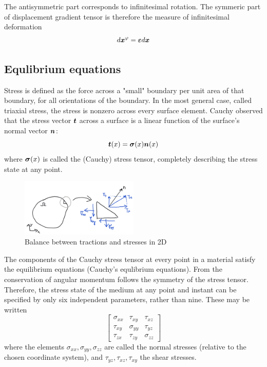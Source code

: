 \documentclass[11pt]{article}
\begin{document}
The antisymmetric part corresponds to infinitesimal rotation. The symmeric part of displacement gradient tensor is therefore the measure of infinitesimal deformation
$$
d\mbox{\boldmath$x$}^\varphi = \mbox{\boldmath$\varepsilon$} d\mbox{\boldmath$x$}
$$
\subsection{Equlibrium equations}
Stress is defined as the force across a "small" boundary per unit area of that boundary, for all orientations of the boundary. In the most general case, called triaxial stress, the stress is nonzero across every surface element. Cauchy observed that the stress vector $\mbox{\boldmath$t$}$ across a surface is a linear function of the surface's normal vector $\mbox{\boldmath$n$}$:
$$
\mbox{\boldmath$t$}(x)=\mbox{\boldmath$\sigma$}(x)\mbox{\boldmath$n$}(x)
$$
where $\mbox{\boldmath$\sigma$}(x)$ is called the (Cauchy) stress tensor, completely describing the stress state at any point.
\begin{figure}
  \begin{center}
    \includegraphics[width=0.5\textwidth]{tractionstressrelation.png}
  \end{center}
  \label{fig:tractionstressrelation}
  \caption{Balance between tractions and stresses in 2D}
\end{figure}

The components of the Cauchy stress tensor at every point in a material satisfy the equilibrium equations (Cauchy’s equlibrium equations). From the conservation of angular momentum follows the symmetry of the stress tensor. Therefore, the stress state of the medium at any point and instant can be specified by only six independent parameters, rather than nine. These may be written
$$
\left[
  \begin{array}{ccc}
    \sigma_{xx} & \tau_{xy} & \tau_{xz}\\
    \tau_{xy} & \sigma_{yy} & \tau_{yz}\\
    \tau_{zx} & \tau_{zy} & \sigma_{zz}
  \end{array}
\right] 
$$
where the elements $\sigma_{xx}, \sigma_{yy}, \sigma_{zz}$ are called the normal stresses (relative to the chosen coordinate system), and $\tau_{yz}, \tau_{xz}, \tau_{xy}$ the shear stresses.
\end{document}
